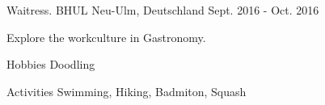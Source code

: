 

\begin{cventries}

  \cventry
    {Waitress.} %
    {BHUL} %
    {Neu-Ulm, Deutschland} %
    {Sept. 2016 - Oct. 2016} %
    {
      \begin{cvitems} %
       \item {Explore the workculture in Gastronomy.}
      \end{cvitems}
    }

\end{cventries}

\begin{cvskills}
\cvskill
	{Hobbies} %
	{Doodling} %

\cvskill
	{Activities} %
	{Swimming, Hiking, Badmiton, Squash} %
\end{cvskills}
